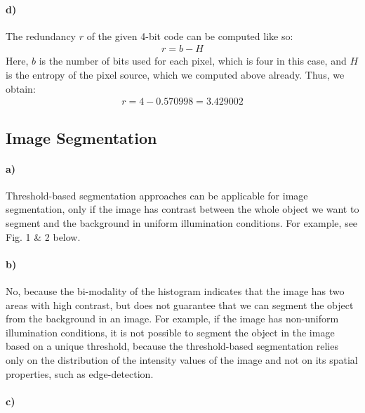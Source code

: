 \documentclass[a4paper,twocolumn]{article}
\begin{document}
	\paragraph{d)} %
	The redundancy $r$ of the given 4-bit code can be computed like so:
	\begin{align*}
	r = b - H
	\end{align*}
	Here, $b$ is the number of bits used for each pixel, which is four in this case, and $H$ is the entropy of the pixel source, which we computed above already. Thus, we obtain:
	\begin{align*}
		r = 4 - 0.570998 = 3.429002
	\end{align*}
	
	\subsection{Image Segmentation}
	
	\paragraph{a)} %
	Threshold-based segmentation approaches can be applicable for image segmentation, only if the image has contrast between the whole object we want to segment and the background in uniform illumination conditions. For example, see Fig. 1 & 2 below.
	
	
	\paragraph{b)} %
	No, because the bi-modality of the histogram indicates that the image has two areas with high contrast, but does not guarantee that we can segment the object from the background in an image. For example, if the image has non-uniform illumination conditions, it is not possible to segment the object in the image based on a unique threshold, because the threshold-based segmentation relies only on the distribution of the intensity values of the image and not on its spatial properties, such as edge-detection.
	
	\paragraph{c)} %
	
\end{document}
